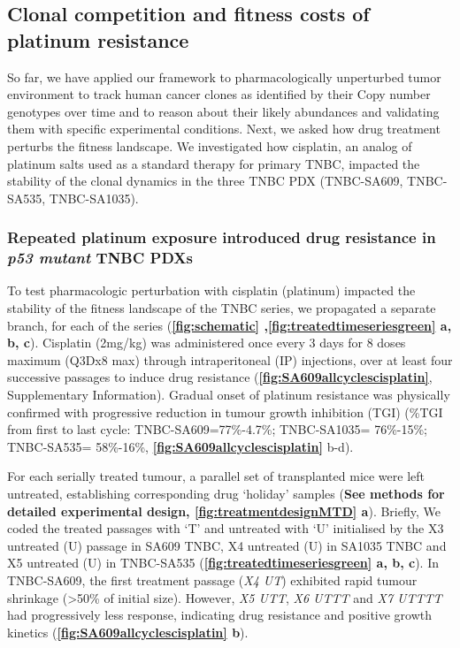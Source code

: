 \subsection{Clonal competition and fitness costs of platinum resistance}
So far, we have applied our framework to pharmacologically unperturbed tumor environment to track human cancer clones as identified by their Copy number genotypes over time and to reason about their likely abundances and validating them with specific experimental conditions. Next, we asked how drug treatment perturbs the fitness landscape. We investigated how cisplatin, an analog of platinum salts used as a standard therapy for primary TNBC, impacted the stability of the clonal dynamics in the three TNBC PDX (TNBC-SA609, TNBC-SA535, TNBC-SA1035).


\subsubsection{Repeated platinum exposure introduced drug resistance in \textit{p53 mutant} TNBC PDXs} 
 To test pharmacologic perturbation with cisplatin (platinum) impacted the stability of the fitness landscape of the TNBC series, we propagated a separate branch, for each of the series (\textbf{\autoref{fig:schematic} ,\autoref{fig:treatedtimeseriesgreen} a, b, c}). Cisplatin (2mg/kg) was administered once every 3 days for 8 doses maximum (Q3Dx8 max) through intraperitoneal (IP) injections, over at least four successive passages to induce drug resistance  (\textbf{\autoref{fig:SA609allcyclescisplatin}}, Supplementary  Information). Gradual onset of platinum resistance was physically confirmed with progressive reduction in tumour growth inhibition (TGI) \cite{hather2014growth} (\%TGI from first to last cycle: TNBC-SA609=77\%-4.7\%; TNBC-SA1035= 76\%-15\%; TNBC-SA535= 58\%-16\%, \textbf{\autoref{fig:SA609allcyclescisplatin}} b-d).
 
 For each serially treated tumour, a parallel set of transplanted mice were left untreated, establishing corresponding drug `holiday' samples (\textbf{See methods for detailed experimental design, \textbf{\autoref{fig:treatmentdesignMTD} a}}). Briefly, We coded the treated passages with `T' and untreated with `U' initialised by the X3 untreated (U) passage in SA609 TNBC, X4 untreated (U) in SA1035 TNBC and X5 untreated (U) in  TNBC-SA535 (\textbf{\autoref{fig:treatedtimeseriesgreen} a, b, c}). In TNBC-SA609, the first treatment passage (\textit{X4 UT}) exhibited rapid tumour shrinkage (>50\% of initial size). However, \textit{X5 UTT}, \textit{X6 UTTT} and \textit{X7 UTTTT} had progressively less response, indicating drug resistance and positive growth kinetics (\textbf{\autoref{fig:SA609allcyclescisplatin} b}).


